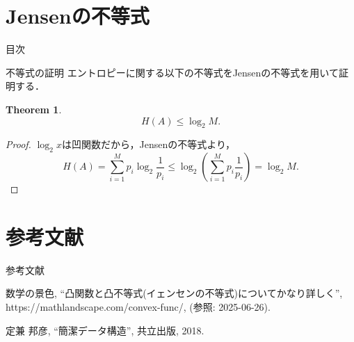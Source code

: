 \documentclass[dvipdfmx]{beamer}
\theoremstyle{plain}
\newtheorem{thm}{Theorem}
\theoremstyle{definition}
\begin{document}
\section{Jensenの不等式}
\begin{frame}{目次}
	\tableofcontents[currentsection]
\end{frame}

\begin{frame}{不等式の証明}
    エントロピーに関する以下の不等式をJensenの不等式を用いて証明する．
    \begin{thm}
        \[
        H(A) \le \log_2 M.
        \]
    \end{thm}

    \begin{proof}
        $\log_2 x$は凹関数だから，Jensenの不等式より，
        \[
            H(A) = \sum_{i=1}^M p_{i} \log_2 \frac{1}{p_{i}} \le \log_2 (\sum_{i=1}^M p_{i} \frac{1}{p_{i}}) = \log_2 M.
        \]
    \end{proof}
\end{frame}

\section*{参考文献}
\begin{frame}{参考文献}
\begin{thebibliography}{9}
\renewcommand{\baselinestretch}{1.0}
\small
\beamertemplatetextbibitems
{}
    数学の景色,
    ``凸関数と凸不等式(イェンセンの不等式)についてかなり詳しく'',
    https://mathlandscape.com/convex-func/,
    (参照: 2025-06-26).

    定兼 邦彦,
    ``簡潔データ構造'',
    共立出版, 2018.

\end{thebibliography}
\end{frame}
\end{document}
